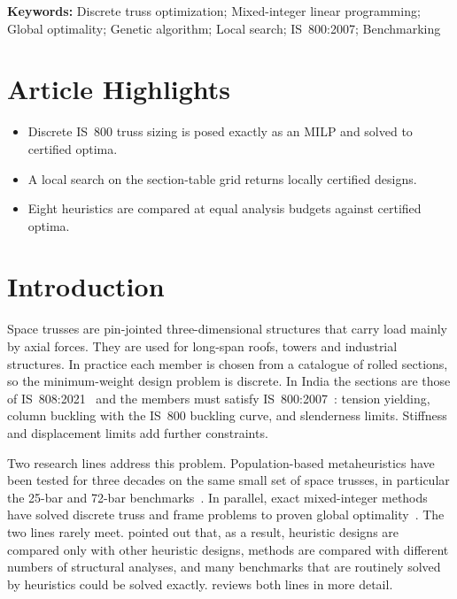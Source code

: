 \documentclass[lineno,pdflatex,sn-mathphys-num]{sn-jnl}
\begin{document}
\vspace{0.6em}
\noindent\textbf{Keywords:} Discrete truss optimization; Mixed-integer linear programming; Global optimality; Genetic algorithm; Local search; IS~800:2007; Benchmarking

\section*{Article Highlights}
\begin{itemize}
  \item Discrete IS~800 truss sizing is posed exactly as an MILP and solved to certified optima.
  \item A local search on the section-table grid returns locally certified designs.
  \item Eight heuristics are compared at equal analysis budgets against certified optima.
\end{itemize}

\section{Introduction}
\label{sec:intro}

Space trusses are pin-jointed three-dimensional structures that carry load
mainly by axial forces. They are used for long-span roofs, towers and
industrial structures. In practice each member is chosen from a catalogue of
rolled sections, so the minimum-weight design problem is discrete. In India the
sections are those of IS~808:2021~\citep{IS808} and the members must satisfy
IS~800:2007~\citep{IS800}: tension yielding, column buckling with the
IS~800 buckling curve, and slenderness limits. Stiffness and displacement
limits add further constraints.

Two research lines address this problem. Population-based metaheuristics
have been tested for three decades on the same small set of space trusses, in
particular the 25-bar and 72-bar
benchmarks~\citep{Rajeev1992,Camp2004,Camp2007,Perez2007,Degertekin2013,Shallan2014}.
In parallel, exact mixed-integer methods have solved discrete truss and frame
problems to proven global
optimality~\citep{Achtziger2007,Rasmussen2008,Kanno2010,Mela2014,VanMellaert2018}.
The two lines rarely meet. \citet{Stolpe2016} pointed out that, as a result,
heuristic designs are compared only with other heuristic designs, methods are
compared with different numbers of structural analyses, and many benchmarks
that are routinely solved by heuristics could be solved exactly.
 reviews both lines in more detail.
\end{document}

